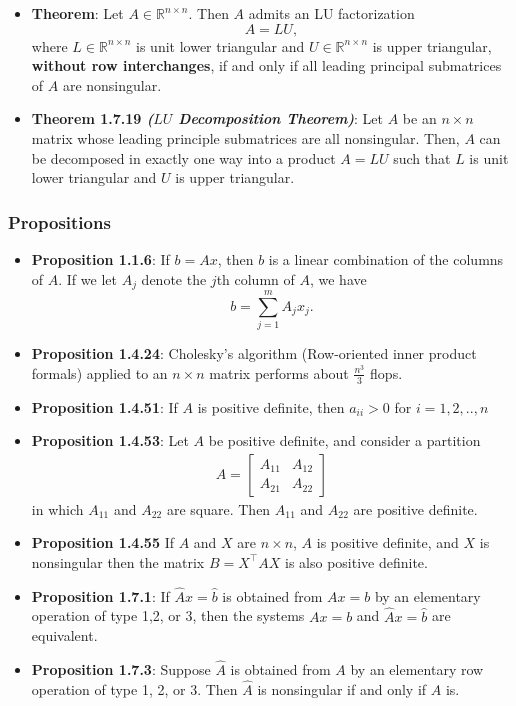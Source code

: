 \documentclass{report}
\begin{document}
\begin{itemize}
    \item \textbf{Theorem}: Let $A \in \mathbb{R}^{n \times n}$. Then $A$ admits an LU factorization
            \[
                A = LU,
            \]
            where $L \in \mathbb{R}^{n \times n}$ is unit lower triangular and 
            $U \in \mathbb{R}^{n \times n}$ is upper triangular, 
            \textbf{without row interchanges}, if and only if all leading principal 
            submatrices of $A$ are nonsingular.
    \item \textbf{Theorem 1.7.19 \textit{($LU$ Decomposition Theorem)}}: Let $A$ be an $n\times n$ matrix whose leading principle submatrices are all nonsingular. Then, $A$ can be decomposed in exactly one way into a product $A = LU$ such that $L$ is unit lower triangular and $U$ is upper triangular.


    \end{itemize}

    \pagebreak \bigbreak \noindent 
    \subsubsection{Propositions}
    \begin{itemize}
        \item \textbf{Proposition 1.1.6}: If $b = Ax$, then $b$ is a linear combination of the columns of $A$.
            \bigbreak \noindent 
            If we let $A_{j}$ denote the $j$th column of $A$, we have
            \[
                b = \sum_{j=1}^{m} A_{j} x_{j}.
            \]
        \item \textbf{Proposition 1.4.24}: Cholesky's algorithm (Row-oriented inner product formals) applied to an $n \times n$ matrix performs about $\frac{n^{3}}{3} $ flops.
        \item \textbf{Proposition 1.4.51}: If $A$ is positive definite, then $a_{ii} > 0$ for $i = 1,2,..,n$
        \item  \textbf{Proposition 1.4.53}: Let $A$ be positive definite, and consider a partition
            \begin{align*}
                A = \begin{bmatrix} A_{11} & A_{12} \\ A_{21} & A_{22} \end{bmatrix}
            \end{align*}
            in which $A_{11}$ and $A_{22} $ are square. Then $A_{11}$ and $A_{22}$ are positive definite.
        \item \textbf{Proposition 1.4.55} If $A$ and $X$ are $n\times n$, $A$ is positive definite, and $X$ is nonsingular then the matrix $B = X^{\top}AX$ is also positive definite.
        \item \textbf{Proposition 1.7.1}: If $\hat{A}x = \hat{b}$ is obtained from $Ax = b$ by an elementary operation of type 1,2, or 3, then the systems $Ax = b$ and $\hat{A}x = \hat{b}$ are equivalent.
        \item \textbf{Proposition 1.7.3}:  Suppose $\hat{A}$ is obtained from $A$ by an elementary row operation of
            type 1, 2, or 3. Then $\hat{A}$ is nonsingular if and only if $A$ is.
    \end{itemize}
\end{document}
